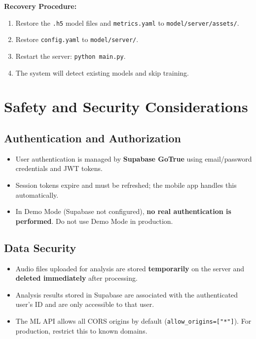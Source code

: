\documentclass[10pt, a4paper, oneside]{report}
\begin{document}
\textbf{Recovery Procedure:}
\begin{enumerate}[leftmargin=*, nosep]
  \item Restore the \texttt{.h5} model files and \texttt{metrics.yaml} to \texttt{model/server/assets/}.
  \item Restore \texttt{config.yaml} to \texttt{model/server/}.
  \item Restart the server: \texttt{python main.py}.
  \item The system will detect existing models and skip training.
\end{enumerate}


\chapter{Safety and Security Considerations}
\label{ch:safety}

\section{Authentication and Authorization}

\begin{itemize}[leftmargin=*, nosep]
  \item User authentication is managed by \textbf{Supabase GoTrue} using email/password credentials and JWT tokens.
  \item Session tokens expire and must be refreshed; the mobile app handles this automatically.
  \item In Demo Mode (Supabase not configured), \textbf{no real authentication is performed}. Do not use Demo Mode in production.
\end{itemize}

\section{Data Security}

\begin{itemize}[leftmargin=*, nosep]
  \item Audio files uploaded for analysis are stored \textbf{temporarily} on the server and \textbf{deleted immediately} after processing.
  \item Analysis results stored in Supabase are associated with the authenticated user's ID and are only accessible to that user.
  \item The ML API allows all CORS origins by default (\texttt{allow\_origins=["*"]}). For production, restrict this to known domains.
\end{itemize}
\end{document}

